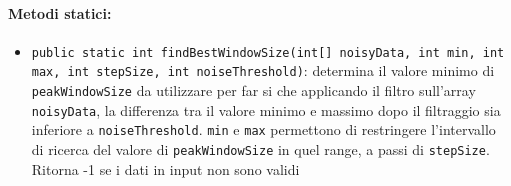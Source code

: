 \paragraph{Metodi statici:}\begin{itemize}
	\item \texttt{public static int findBestWindowSize(int[] noisyData, int min, int max, int stepSize, int noiseThreshold)}: determina il valore minimo di \texttt{peakWindowSize} da utilizzare per far si che applicando il filtro sull'array \texttt{noisyData}, la differenza tra il valore minimo e massimo dopo il filtraggio sia inferiore a \texttt{noiseThreshold}. \texttt{min} e \texttt{max} permettono di restringere l'intervallo di ricerca del valore di \texttt{peakWindowSize} in quel range, a passi di \texttt{stepSize}. Ritorna -1 se i dati in input non sono validi
\end{itemize}

